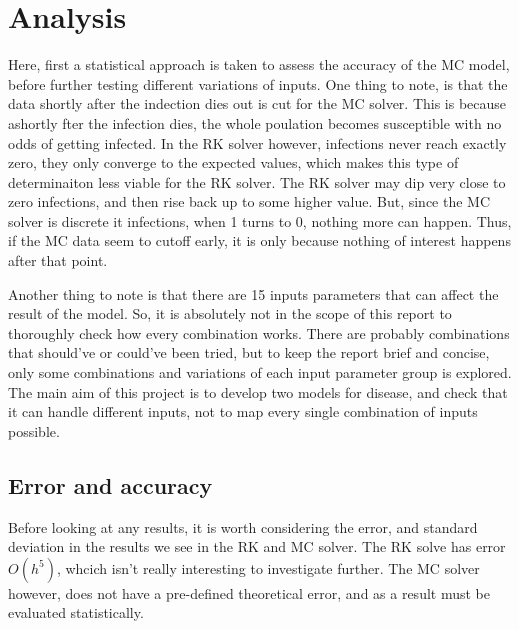 \section{Analysis}
Here, first a statistical approach is taken to assess the accuracy of the MC model, before further testing different variations of inputs.
One thing to note, is that the data shortly after the indection dies out is cut for the MC solver. 
This is because ashortly fter the infection dies, the whole poulation becomes susceptible with no odds of getting infected.
In the RK solver however, infections never reach exactly zero, they only converge to the expected values, which makes this type of determinaiton less viable for the RK solver.
The RK solver may dip very close to zero infections, and then rise back up to some higher value. 
But, since the MC solver is discrete it infections, when 1 turns to 0, nothing more can happen.
Thus, if the MC data seem to cutoff early, it is only because nothing of interest happens after that point.

Another thing to note is that there are 15 inputs parameters that can affect the result of the model. 
So, it is absolutely not in the scope of this report to thoroughly check how every combination works.
There are probably combinations that should've or could've been tried, but to keep the report brief and concise, only some combinations and variations of each input parameter group is explored.
The main aim of this project is to develop two models for disease, and check that it can handle different inputs, not to map every single combination of inputs possible.
\subsection{Error and accuracy}
Before looking at any results, it is worth considering the error, and standard deviation in the results we see in the RK and MC solver.
The RK solve has error $O(h^5)$, whcich isn't really interesting to investigate further.
The MC solver however, does not have a pre-defined theoretical error, and as a result must be evaluated statistically.


